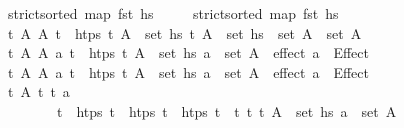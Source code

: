 \begin{isabellebody}
\ \ \ \ \ {\isachardoublequoteopen}strict{\isacharunderscore}{\kern0pt}sorted\ {\isacharparenleft}{\kern0pt}map\ fst\ hs{\isacharparenright}{\kern0pt}{\isachardoublequoteclose}\isanewline
\ \ \ \ \ {\isachardoublequoteopen}strict{\isacharunderscore}{\kern0pt}sorted\ {\isacharparenleft}{\kern0pt}map\ fst\ hs{\isacharprime}{\kern0pt}{\isacharparenright}{\kern0pt}{\isachardoublequoteclose}\isanewline
\ \ \ \ \ {\isachardoublequoteopen}{\isasymAnd}t\ A\ A{\isacharprime}{\kern0pt}{\isachardot}{\kern0pt}\ {\isasymlbrakk}t\ {\isasymin}\ htps{\isacharsemicolon}{\kern0pt}\ {\isacharparenleft}{\kern0pt}t{\isacharcomma}{\kern0pt}\ A{\isacharparenright}{\kern0pt}\ {\isasymin}\ set\ hs{\isacharsemicolon}{\kern0pt}\ {\isacharparenleft}{\kern0pt}t{\isacharcomma}{\kern0pt}\ A{\isacharprime}{\kern0pt}{\isacharparenright}{\kern0pt}\ {\isasymin}\ set\ hs{\isacharprime}{\kern0pt}{\isasymrbrakk}\ {\isasymLongrightarrow}\ set\ A\ {\isacharequal}{\kern0pt}\ set\ A{\isacharprime}{\kern0pt}{\isachardoublequoteclose}\isanewline
\ \ \ \ \ {\isachardoublequoteopen}{\isasymAnd}t\ A\ A{\isacharprime}{\kern0pt}\ a{\isachardot}{\kern0pt}\ {\isasymlbrakk}t\ {\isasymnotin}\ htps{\isacharsemicolon}{\kern0pt}\ {\isacharparenleft}{\kern0pt}t{\isacharcomma}{\kern0pt}\ A{\isacharparenright}{\kern0pt}\ {\isasymin}\ set\ hs{\isacharsemicolon}{\kern0pt}\ a\ {\isasymin}\ set\ A{\isasymrbrakk}\ {\isasymLongrightarrow}\ effect\ a\ {\isacharequal}{\kern0pt}\ Effect\ {\isacharbrackleft}{\kern0pt}{\isacharbrackright}{\kern0pt}\ {\isacharbrackleft}{\kern0pt}{\isacharbrackright}{\kern0pt}{\isachardoublequoteclose}\isanewline
\ \ \ \ \ {\isachardoublequoteopen}{\isasymAnd}t\ A\ A{\isacharprime}{\kern0pt}\ a{\isachardot}{\kern0pt}\ {\isasymlbrakk}t\ {\isasymnotin}\ htps{\isacharsemicolon}{\kern0pt}\ {\isacharparenleft}{\kern0pt}t{\isacharcomma}{\kern0pt}\ A{\isacharparenright}{\kern0pt}\ {\isasymin}\ set\ hs{\isacharprime}{\kern0pt}{\isacharsemicolon}{\kern0pt}\ a\ {\isasymin}\ set\ A{\isasymrbrakk}\ {\isasymLongrightarrow}\ effect\ a\ {\isacharequal}{\kern0pt}\ Effect\ {\isacharbrackleft}{\kern0pt}{\isacharbrackright}{\kern0pt}\ {\isacharbrackleft}{\kern0pt}{\isacharbrackright}{\kern0pt}{\isachardoublequoteclose}\isanewline
\ \ \ \ \ {\isachardoublequoteopen}{\isasymAnd}t\ A\ t\ t\ a{\isachardot}{\kern0pt}\isanewline
\ \ \ \ \ \ \ \ \ \ \ \ {\isasymlbrakk}t\ {\isasymnotin}\ htps{\isacharsemicolon}{\kern0pt}\ t\ {\isasymin}\ htps{\isacharsemicolon}{\kern0pt}\ t\ {\isasymin}\ htps{\isacharsemicolon}{\kern0pt}\ t\ {\isasymin}\ {\isacharbraceleft}{\kern0pt}t\ t\ {\isacharparenleft}{\kern0pt}t{\isacharcomma}{\kern0pt}\ A{\isacharparenright}{\kern0pt}\ {\isasymin}\ set\ hs{\isacharsemicolon}{\kern0pt}\ a\ {\isasymin}\ set\ A{\isasymrbrakk}\ {\isasymLongrightarrow}\ \isanewline

\end{isabellebody}
